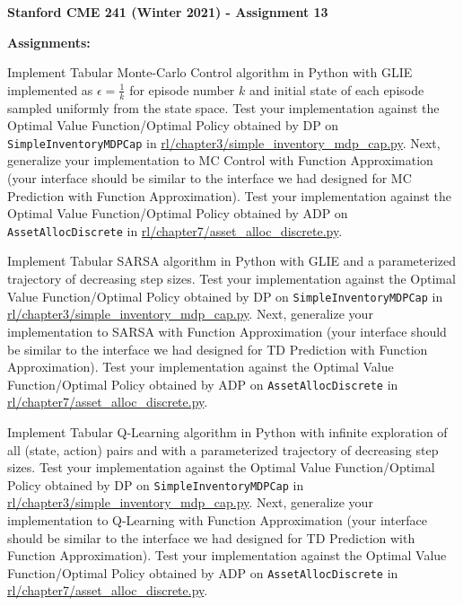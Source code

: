 \documentclass[12pt]{exam}
\begin{document}
\begin{center}
{\large {\bf Stanford CME 241 (Winter 2021) - Assignment 13}}
\end{center}
 
{\large{\bf Assignments:}}
\begin{questions}

\question Implement Tabular Monte-Carlo Control algorithm in Python with GLIE implemented as $\epsilon = \frac 1 k$ for episode number $k$ and initial state of each episode sampled uniformly from the state space. Test your implementation against the Optimal Value Function/Optimal Policy obtained by DP on \lstinline{SimpleInventoryMDPCap} in \href{https://github.com/TikhonJelvis/RL-book/blob/master/rl/chapter3/simple_inventory_mdp_cap.py}{rl\//chapter3\//simple\_inventory\_mdp\_cap.py}. Next, generalize your implementation to MC Control with Function Approximation (your interface should be similar to the interface we had designed for MC Prediction with Function Approximation). Test your implementation against the Optimal Value Function/Optimal Policy obtained by ADP on \lstinline{AssetAllocDiscrete} in \href{https://github.com/TikhonJelvis/RL-book/blob/master/rl/chapter7/asset_alloc_discrete.py}{rl\//chapter7\//asset\_alloc\_discrete.py}.

\question Implement Tabular SARSA algorithm in Python with GLIE and a parameterized trajectory of decreasing step sizes. Test your implementation against the Optimal Value Function/Optimal Policy obtained by DP on \lstinline{SimpleInventoryMDPCap} in \href{https://github.com/TikhonJelvis/RL-book/blob/master/rl/chapter3/simple_inventory_mdp_cap.py}{rl\//chapter3\//simple\_inventory\_mdp\_cap.py}. Next, generalize your implementation to SARSA with Function Approximation (your interface should be similar to the interface we had designed for TD Prediction with Function Approximation). Test your implementation against the Optimal Value Function/Optimal Policy obtained by ADP on \lstinline{AssetAllocDiscrete} in \href{https://github.com/TikhonJelvis/RL-book/blob/master/rl/chapter7/asset_alloc_discrete.py}{rl\//chapter7\//asset\_alloc\_discrete.py}.

\question Implement Tabular Q-Learning algorithm in Python with infinite exploration of all (state, action) pairs and with a parameterized trajectory of decreasing step sizes. Test your implementation against the Optimal Value Function/Optimal Policy obtained by DP on \lstinline{SimpleInventoryMDPCap} in \href{https://github.com/TikhonJelvis/RL-book/blob/master/rl/chapter3/simple_inventory_mdp_cap.py}{rl\//chapter3\//simple\_inventory\_mdp\_cap.py}. Next, generalize your implementation to Q-Learning with Function Approximation (your interface should be similar to the interface we had designed for TD Prediction with Function Approximation). Test your implementation against the Optimal Value Function/Optimal Policy obtained by ADP on \lstinline{AssetAllocDiscrete} in \href{https://github.com/TikhonJelvis/RL-book/blob/master/rl/chapter7/asset_alloc_discrete.py}{rl\//chapter7\//asset\_alloc\_discrete.py}.


\end{questions}
\end{document}
